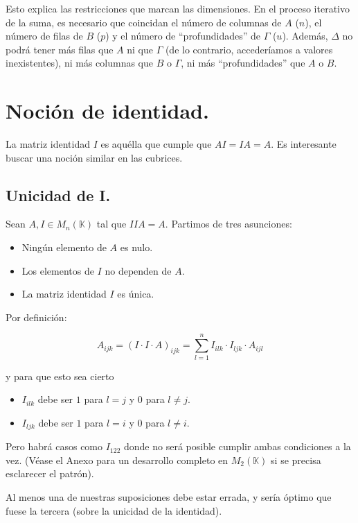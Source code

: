 \documentclass[a4paper, titlepage]{article}
\begin{document}
Esto explica las restricciones que marcan las dimensiones. En el proceso iterativo de la suma, es necesario que coincidan el número de columnas de $A$ ($n$), el número de filas de $B$ ($p$) y el número de ``profundidades'' de $\Gamma$ ($u$). Además, $\Delta$ no podrá tener más filas que $A$ ni que $\Gamma$ (de lo contrario, accederíamos a valores inexistentes), ni más columnas que $B$ o $\Gamma$, ni más ``profundidades'' que $A$ o $B$.

\section{Noción de identidad.}

La matriz identidad $I$ es aquélla que cumple que $AI = IA = A$. Es interesante buscar una noción similar en las cubrices.

\subsection{Unicidad de I.}

Sean $A, I \in M_{n} (\mathbb{K})$ tal que $IIA = A$. Partimos de tres asunciones:

\begin{itemize}
	\item Ningún elemento de $A$ es nulo.
	\item Los elementos de $I$ no dependen de $A$.
	\item La matriz identidad $I$ es única.
\end{itemize}

Por definición:

$$A_{ijk} = (I \cdot I \cdot A)_{ijk} = \sum\limits_{l=1}^{n} I_{ilk} \cdot I_{ljk} \cdot A_{ijl}$$

y para que esto sea cierto

\begin{itemize}
	\item $I_{ilk}$ debe ser $1$ para $l = j$ y $0$ para $l \neq j$. 
	\item $I_{ljk}$ debe ser $1$ para $l = i$ y $0$ para $l \neq i$.
\end{itemize}

Pero habrá casos como $I_{122}$ donde no será posible cumplir ambas condiciones a la vez. (Véase el Anexo para un desarrollo completo en $M_2 (\mathbb{K})$ si se precisa esclarecer el patrón).

Al menos una de nuestras suposiciones debe estar errada, y sería óptimo que fuese la tercera (sobre la unicidad de la identidad).
\end{document}
